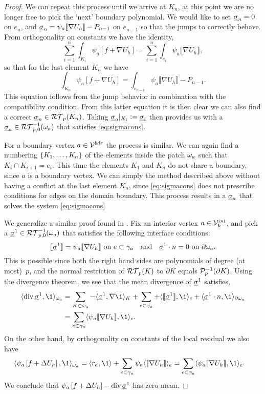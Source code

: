 \documentclass[thesis.tex]{subfiles}
\begin{document}
\begin{proof}
  We can repeat this process until we arrive at $K_n$, at this point we are no longer
  free to pick the `next'  boundary polynomial. We would like to set 
  $\vsig_n = 0$ on $e_n$, and $\vsig_n = \psi_a \llbracket \nabla U_h \rrbracket - P_{n-1}$ on $e_{n-1}$ so that the jumps to correctly behave.
  From orthogonality on constants we have the identity,
  \[
    \sum_{i = 1}^n \int_{K_i} \psi_a \left[f+\nabla U_h\right] = \sum_{i = 1}^n \int_{e_i} \psi_a \llbracket \nabla U_h \rrbracket,
  \]
  so that for the last element $K_n$ we have
  \[
    \int_{K_n} \psi_a \left[ f+ \nabla U_h \right] = \int_{e_{n-1}} \psi_a \llbracket \nabla U_h \rrbracket - P_{n-1}.
  \]
  This equation follows from the jump behavior in combination with the compatibility condition. From this latter equation it is then clear
  we can also find a correct $\vsig_n \in \RT_p(K_{n})$. Taking $\vsig_a|_{K_i} := \vsig_i$ then provides us with a $\vsig_a \in \RT_{p,0}^{-1}(\w_a)$ that satisfies \eqref{eq:sigmacons}.

  For a boundary vertex $a \in \V^{bdr}$ the process is similar.  We can again find a numbering $\set{K_1, \dots, K_n}$
  of the elements inside the patch $\w_a$ such that $K_i \cap K_{i+1} = e_i$. This time the
  elements $K_1$ and $K_n$ do not share a boundary, since $a$ is a boundary vertex. We can simply the method described above
  without having a conflict at the last element $K_n$, since \eqref{eq:sigmacons} does not prescribe conditions for edges
  on the domain boundary. This process results in a $\vsig_a$ that solves the system \eqref{eq:sigmacons}

  {
    \color{blue}
  We generalize a similar proof found in  \cite[Lemma~3]{braessequil}. Fix an interior vertex $a \in \V_h^{int}$,
  and pick a $\vsig^1 \in \RT_{p,0}^{-1}(\w_a)$ that satisfies the
  following interface conditions:
  \[
    \llbracket \vsig^1 \rrbracket = \psi_a \llbracket \nabla U_h \rrbracket \,\, \text{on } e \subset \gamma_a \quad \text{and}\quad \vsig^1 \cdot n = 0 
    \,\,\text {on } \partial \w_a.
  \]
  This is possible since both the right hand sides are polynomials of degree (at most)~$p$, and
  the normal restriction of $\RT_{p}(K)$ to  $\partial K$ equals $\P_p^{-1}(\partial K)$.  Using the divergence theorem, we see that the mean divergence of $\vsig^1$ satisfies,
  \begin{align*}
    \ip{\div \vsig^1,\1}_{\w_a} &=  
    \sum_{ K \subset \w_a} -\ip{\vsig^1, \nabla \1}_{K} + \sum_{ e \subset \gamma_a} +\ip{\llbracket \vsig^1 \rrbracket, \1}_{e} + \ip{\vsig^1\cdot n, \1}_{\partial \w_a}\\
    &=\sum_{ e \subset \gamma_a} \ip{\psi_a \llbracket \nabla U_h  \rrbracket, \1}_{e}.
  \end{align*}
  On the other hand, by orthogonality on constants of the local residual we also have
  \begin{align*}
    \ip{\psi_a \left[ f + \Delta U_h \right],\1}_{\w_a} &= \ip{r_a, \1} + 
    \sum_{ e \subset \gamma_a}\psi_a \ip{\llbracket \nabla U_h \rrbracket}_e = \sum_{ e\subset \gamma_a} \ip{\psi_a\llbracket \nabla U_h \rrbracket, \1}_e.
  \end{align*}
  We conclude that  $ \psi_a \left[ f+ \Delta U_h\right]  - \div \vsig^1 $ has zero mean.
  
}
\end{proof}
\end{document}
